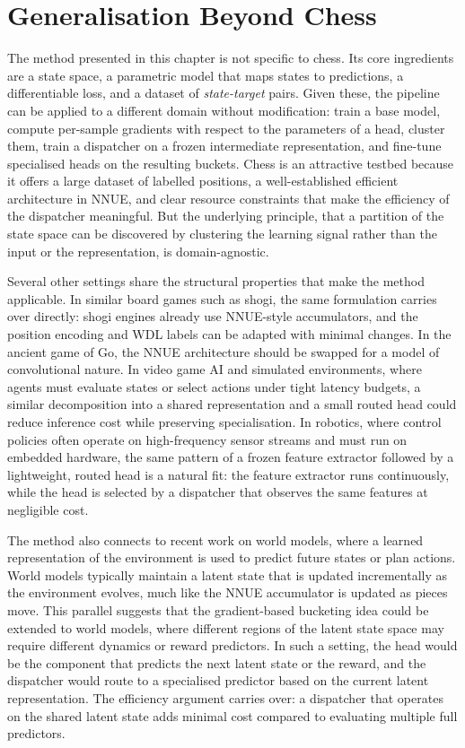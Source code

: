 \section{Generalisation Beyond Chess}\label{sec:generalisation-method}

The method presented in this chapter is not specific to chess. Its core ingredients are a state space, a parametric model that maps states to predictions, a differentiable loss, and a dataset of \emph{state-target} pairs. Given these, the pipeline can be applied to a different domain without modification: train a base model, compute per-sample gradients with respect to the parameters of a head, cluster them, train a dispatcher on a frozen intermediate representation, and fine-tune specialised heads on the resulting buckets. Chess is an attractive testbed because it offers a large dataset of labelled positions, a well-established efficient architecture in NNUE, and clear resource constraints that make the efficiency of the dispatcher meaningful. But the underlying principle, that a partition of the state space can be discovered by clustering the learning signal rather than the input or the representation, is domain-agnostic.

Several other settings share the structural properties that make the method applicable. In similar board games such as shogi, the same formulation carries over directly: shogi engines already use NNUE-style accumulators, and the position encoding and WDL labels can be adapted with minimal changes. In the ancient game of Go, the NNUE architecture should be swapped for a model of convolutional nature. In video game AI and simulated environments, where agents must evaluate states or select actions under tight latency budgets, a similar decomposition into a shared representation and a small routed head could reduce inference cost while preserving specialisation. In robotics, where control policies often operate on high-frequency sensor streams and must run on embedded hardware, the same pattern of a frozen feature extractor followed by a lightweight, routed head is a natural fit: the feature extractor runs continuously, while the head is selected by a dispatcher that observes the same features at negligible cost.

The method also connects to recent work on world models, where a learned representation of the environment is used to predict future states or plan actions. World models typically maintain a latent state that is updated incrementally as the environment evolves, much like the NNUE accumulator is updated as pieces move. This parallel suggests that the gradient-based bucketing idea could be extended to world models, where different regions of the latent state space may require different dynamics or reward predictors. In such a setting, the head would be the component that predicts the next latent state or the reward, and the dispatcher would route to a specialised predictor based on the current latent representation. The efficiency argument carries over: a dispatcher that operates on the shared latent state adds minimal cost compared to evaluating multiple full predictors.

